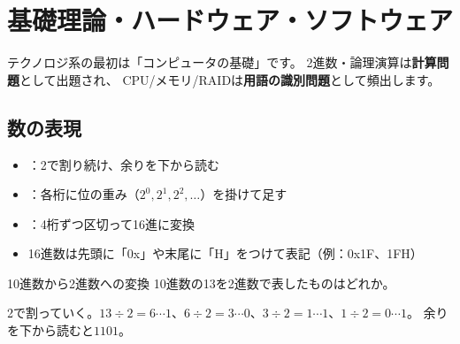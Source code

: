\chapter{基礎理論・ハードウェア・ソフトウェア}


テクノロジ系の最初は「コンピュータの基礎」です。
2進数・論理演算は\textbf{計算問題}として出題され、
CPU/メモリ/RAIDは\textbf{用語の識別問題}として頻出します。

\section{数の表現}

\begin{teigi}[基数変換の基本]
\begin{itemize}
  \item {}：2で割り続け、余りを下から読む
  \item {}：各桁に位の重み（$2^0, 2^1, 2^2, \ldots$）を掛けて足す
  \item {}：4桁ずつ区切って16進に変換
  \item 16進数は先頭に「0x」や末尾に「H」をつけて表記（例：0x1F、1FH）
\end{itemize}
\end{teigi}

\begin{reidai}{10進数から2進数への変換}
10進数の13を2進数で表したものはどれか。

\end{reidai}

\begin{shishin}
2で割っていく。$13 \div 2 = 6 \cdots 1$、$6 \div 2 = 3 \cdots 0$、$3 \div 2 = 1 \cdots 1$、$1 \div 2 = 0 \cdots 1$。
余りを下から読むと$1101$。
\end{shishin}

